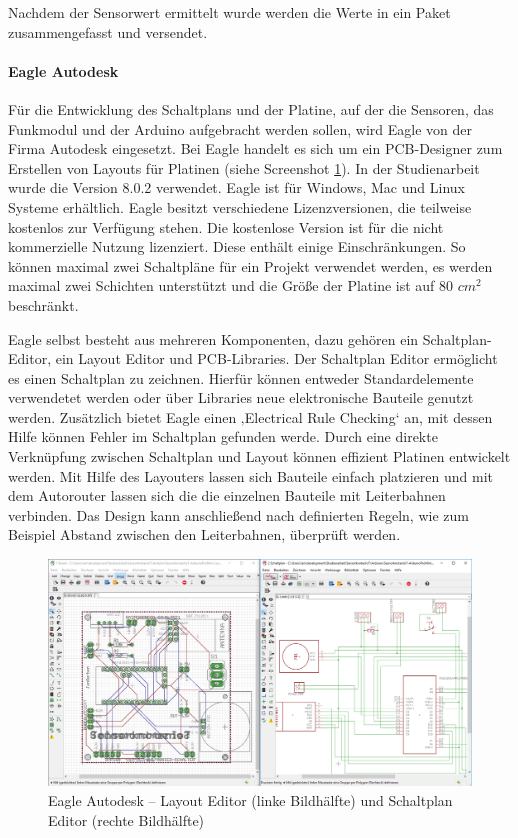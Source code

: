 Nachdem der Sensorwert ermittelt wurde werden die Werte in ein Paket zusammengefasst und versendet.  
\paragraph{Eagle Autodesk} Für die Entwicklung des Schaltplans und der Platine, auf der die Sensoren,  das Funkmodul und der Arduino aufgebracht werden sollen, wird Eagle von der Firma Autodesk eingesetzt. Bei Eagle handelt es sich um ein \ac{PCB}-Designer zum Erstellen von Layouts für Platinen (siehe Screenshot \ref{img:EagleAutodesk}). In der Studienarbeit wurde die Version 8.0.2 verwendet. Eagle ist für Windows, Mac und Linux Systeme erhältlich. Eagle besitzt verschiedene Lizenzversionen, die teilweise kostenlos zur Verfügung stehen. Die kostenlose Version ist für die nicht kommerzielle Nutzung lizenziert. Diese enthält einige Einschränkungen. So können maximal zwei Schaltpläne für ein Projekt verwendet werden, es werden maximal zwei Schichten unterstützt und die Größe der Platine ist auf 80 $cm^{2}$ beschränkt.

Eagle selbst besteht aus mehreren Komponenten, dazu gehören ein Schaltplan-Editor, ein Layout Editor und \ac{PCB}-Libraries. Der Schaltplan Editor ermöglicht es einen Schaltplan zu zeichnen. Hierfür können entweder Standardelemente verwendetet werden oder über Libraries neue elektronische Bauteile genutzt werden. Zusätzlich bietet Eagle einen ‚Electrical Rule Checking‘ an, mit dessen Hilfe können Fehler im Schaltplan gefunden werde. Durch eine direkte Verknüpfung zwischen Schaltplan und Layout können effizient Platinen entwickelt werden. Mit Hilfe des Layouters lassen sich Bauteile einfach platzieren und mit dem Autorouter lassen sich die die einzelnen Bauteile mit Leiterbahnen verbinden. Das Design kann anschließend nach definierten Regeln, wie zum Beispiel Abstand zwischen den Leiterbahnen, überprüft werden. 
\begin{figure}
	\centering
	\includegraphics[width=1\textwidth]{bilder/Eagle}
	\caption[Eagle Autodesk – Layout Editor und Schaltplan Editor]{Eagle Autodesk – Layout Editor (linke Bildhälfte) und Schaltplan Editor (rechte Bildhälfte)}
	\label{img:EagleAutodesk}
\end{figure}
